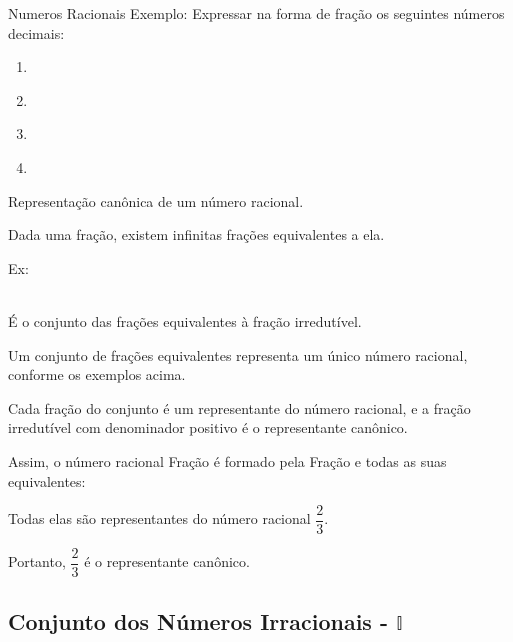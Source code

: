 \begin{multicols*}{2}
Numeros Racionais
Exemplo:
Expressar na forma de fração os seguintes números decimais:

	\begin{enumerate}

	\item {}\\

	\item {}\\

	\item {} \\
	
	\item {}  

	\end{enumerate}

Representação canônica de um número racional.

Dada uma fração, existem infinitas frações equivalentes a ela.

Ex:

\\

É o conjunto das frações equivalentes à fração irredutível.

Um conjunto de frações equivalentes representa um único número racional, conforme os exemplos acima.

Cada fração do conjunto é um representante do número racional, e a fração irredutível com denominador positivo é o representante canônico.

Assim, o número racional Fração é formado pela Fração e todas as suas equivalentes:

Todas elas são representantes do número racional $\dfrac{2}{3} $.

Portanto, $ \dfrac{2}{3} $ é o representante canônico.\\
		
		\subsection{Conjunto dos Números Irracionais - $\mathbb{I}$}
		

\end{multicols*}
